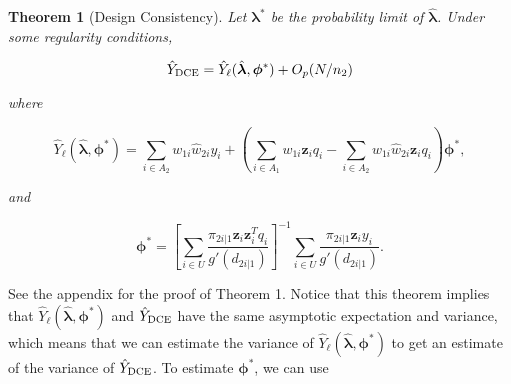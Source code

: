 \documentclass[12pt]{article}
\newtheorem{theorem}{Theorem}
\newcommand{\bx}{\mathbf{x}}
\renewcommand{\bf}[1]{\mathbf{#1}}
\begin{document}
\begin{theorem}[Design Consistency]\label{thm:dc1}
  Let $\bm \lambda^*$ be the probability limit of $\hat{\bm \lambda}$. 
  Under some regularity conditions,

  $$
  \hat Y_{\rm DCE} = \hat Y_\ell(\hat{\bm{\lambda}}, \bm \phi^*) + O_p(N / n_2)
  $$

  where

  $$
  \hat Y_{\ell}(\hat{\bm \lambda}, \bm \phi^*) = 
  \sum_{i \in A_2} w_{1i} \hat w_{2i} y_i
  + \left(\sum_{i \in A_1} w_{1i} \bf z_i q_i - 
    \sum_{i \in A_2} w_{1i} \hat w_{2i} \bf{z}_i q_i\right)\bm \phi^*,
  $$

  and

  $$
  \bm \phi^* = 
  \left[\sum_{i \in U} \frac{\pi_{2i|1}\bf z_i \bf z_i^T q_i}{g'(d_{2i|1})}\right]^{-1}
  \sum_{i \in U} \frac{\pi_{2i|1}\bf z_i y_i}{g'(d_{2i|1})}.
  $$

%

\end{theorem}

See the appendix for the proof of Theorem 1. Notice that this theorem implies
that $\hat Y_{\ell}(\hat{\bm \lambda}, \bm \phi^*)$ and $\hat Y_{\rm DCE}$ have
the same asymptotic expectation and variance, which means that we can estimate
the variance of $\hat Y_{\ell}(\hat{\bm \lambda}, \bm \phi^*)$ to get an
estimate of the variance of $\hat Y_{\rm DCE}$. To estimate $\bm \phi^*$, we can
use
\end{document}
